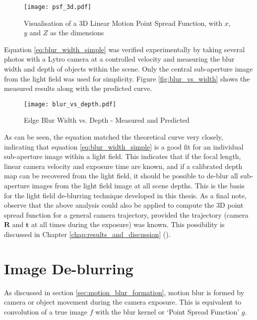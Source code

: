 \begin{figure}[h]
\centering
\texttt{[image: psf\_3d.pdf]}
\caption[Visualisation of a 3D Point Spread Function]{Visualisation of a 3D Linear Motion Point Spread Function, with $x$, $y$ and $Z$ as the dimensions}
\label{fig:psf_3d}
\end{figure}

Equation \ref{eq:blur_width_simple} was verified experimentally by taking several photos with a Lytro camera at a controlled velocity and measuring the blur width and depth of objects within the scene.
Only the central sub-aperture image from the light field was used for simplicity.
Figure \ref{fig:blur_vs_width} shows the measured results along with the predicted curve.

\begin{figure}[h]
\centering
\caption[Edge Blur Width vs. Depth]{Edge Blur Width vs. Depth - Measured and Predicted}
\label{fig:blur_vs_depth}
\texttt{[image: blur\_vs\_depth.pdf]}
\end{figure}

As can be seen, the equation matched the theoretical curve very closely, indicating that equation \ref{eq:blur_width_simple} is a good fit for an individual sub-aperture image within a light field.
This indicates that if the focal length, linear camera velocity and exposure time are known, and if a calibrated depth map can be recovered from the light field, it should be possible to de-blur all sub-aperture images from the light field image at all scene depths.
This is the basis for the light field de-blurring technique developed in this thesis.
As a final note, observe that the above analysis could also be applied to compute the 3D point spread function for a general camera trajectory, provided the trajectory (camera $\boldsymbol{R}$ and $\boldsymbol{t}$ at all times during the exposure) was known.
This possibility is discussed in Chapter \ref{chap:results_and_discussion} ().


\section{Image De-blurring}
\label{sec:image_deblurring}

As discussed in section \ref{sec:motion_blur_formation}, motion blur is formed by camera or object movement during the camera exposure.
This is equivalent to convolution of a true image $f$ with the blur kernel or \enquote*{Point Spread Function} $g$.

